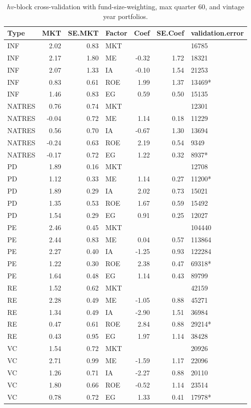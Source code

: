\documentclass[12pt]{article}
\begin{document}
\begin{table}[ht]
	\centering
	\begin{tabular}{lrrlrrl}
		Type & MKT & SE.MKT & Factor & Coef & SE.Coef & validation.error \\ 
		\hline
		\hline
		INF & 2.02 & 0.83 & MKT &  &  & 16785 \\ 
		INF & 2.17 & 1.80 & ME & -0.32 & 1.72 & 18321 \\ 
		INF & 2.07 & 1.33 & IA & -0.10 & 1.54 & 21253 \\ 
		INF & 0.83 & 0.61 & ROE & 1.99 & 1.37 & 13469* \\ 
		INF & 1.46 & 0.83 & EG & 0.59 & 0.50 & 15135 \\ 
		\hline
		NATRES & 0.76 & 0.74 & MKT &  &  & 12301 \\ 
		NATRES & -0.04 & 0.72 & ME & 1.14 & 0.18 & 11229 \\ 
		NATRES & 0.56 & 0.70 & IA & -0.67 & 1.30 & 13694 \\ 
		NATRES & -0.24 & 0.63 & ROE & 2.19 & 0.54 & 9349 \\ 
		NATRES & -0.17 & 0.72 & EG & 1.22 & 0.32 & 8937* \\ 
		\hline
		PD & 1.89 & 0.16 & MKT &  &  & 12708 \\ 
		PD & 1.12 & 0.33 & ME & 1.14 & 0.27 & 11200* \\ 
		PD & 1.89 & 0.29 & IA & 2.02 & 0.73 & 15021 \\ 
		PD & 1.35 & 0.53 & ROE & 1.67 & 0.59 & 15492 \\ 
		PD & 1.54 & 0.29 & EG & 0.91 & 0.25 & 12027 \\ 
		\hline
		PE & 2.46 & 0.45 & MKT &  &  & 104440 \\ 
		PE & 2.44 & 0.83 & ME & 0.04 & 0.57 & 113864 \\ 
		PE & 2.27 & 0.40 & IA & -1.25 & 0.93 & 122284 \\ 
		PE & 1.22 & 0.30 & ROE & 2.38 & 0.47 & 69318* \\ 
		PE & 1.64 & 0.48 & EG & 1.14 & 0.43 & 89799 \\ 
		\hline
		RE & 1.52 & 0.62 & MKT &  &  & 42159 \\ 
		RE & 2.28 & 0.49 & ME & -1.05 & 0.88 & 45271 \\ 
		RE & 1.34 & 0.49 & IA & -2.90 & 1.51 & 36984 \\ 
		RE & 0.47 & 0.61 & ROE & 2.84 & 0.88 & 29214* \\ 
		RE & 0.43 & 0.95 & EG & 1.97 & 1.14 & 38428 \\ 
		\hline
		VC & 1.54 & 0.72 & MKT &  &  & 20926 \\ 
		VC & 2.71 & 0.99 & ME & -1.59 & 1.17 & 22096 \\ 
		VC & 1.26 & 0.71 & IA & -2.27 & 0.88 & 20110 \\ 
		VC & 1.80 & 0.66 & ROE & -0.52 & 1.14 & 23514 \\ 
		VC & 0.78 & 0.72 & EG & 1.33 & 0.41 & 17978* \\ 
		\hline
		\hline
	\end{tabular}
	\caption{$hv$-block cross-validation with fund-size-weighting, max quarter 60, and vintage year portfolios.} 
	\label{tab:cv_60_fw_dep_vyp}
\end{table}
\end{document}
